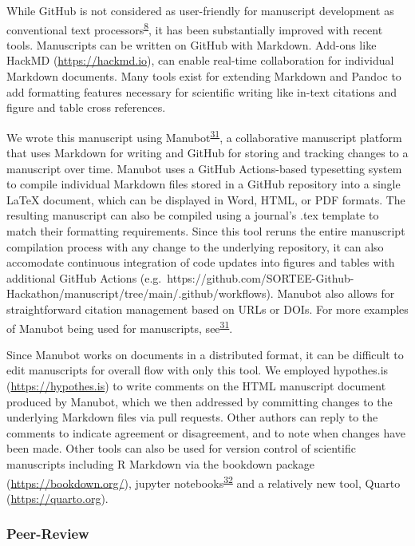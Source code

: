 While GitHub is not considered as user-friendly for manuscript development as conventional text processors\textsuperscript{\protect\hyperlink{ref-4ny1onB0}{8}}, it has been substantially improved with recent tools.
Manuscripts can be written on GitHub with Markdown.
Add-ons like HackMD (\url{https://hackmd.io}), can enable real-time collaboration for individual Markdown documents.
Many tools exist for extending Markdown and Pandoc to add formatting features necessary for scientific writing like in-text citations and figure and table cross references.

We wrote this manuscript using Manubot\textsuperscript{\protect\hyperlink{ref-YuJbg3zO}{31}}, a collaborative manuscript platform that uses Markdown for writing and GitHub for storing and tracking changes to a manuscript over time.
Manubot uses a GitHub Actions-based typesetting system to compile individual Markdown files stored in a GitHub repository into a single LaTeX document, which can be displayed in Word, HTML, or PDF formats.
The resulting manuscript can also be compiled using a journal's .tex template to match their formatting requirements.
Since this tool reruns the entire manuscript compilation process with any change to the underlying repository, it can also accomodate continuous integration of code updates into figures and tables with additional GitHub Actions (e.g.~https://github.com/SORTEE-Github-Hackathon/manuscript/tree/main/.github/workflows).
Manubot also allows for straightforward citation management based on URLs or DOIs.
For more examples of Manubot being used for manuscripts, see\textsuperscript{\protect\hyperlink{ref-YuJbg3zO}{31}}.

Since Manubot works on documents in a distributed format, it can be difficult to edit manuscripts for overall flow with only this tool.
We employed hypothes.is (\url{https://hypothes.is}) to write comments on the HTML manuscript document produced by Manubot, which we then addressed by committing changes to the underlying Markdown files via pull requests.
Other authors can reply to the comments to indicate agreement or disagreement, and to note when changes have been made.
Other tools can also be used for version control of scientific manuscripts including R Markdown via the bookdown package (\url{https://bookdown.org/}), jupyter notebooks\textsuperscript{\protect\hyperlink{ref-i4FOZpjN}{32}} and a relatively new tool, Quarto (\url{https://quarto.org}).

\hypertarget{peer-review}{%
\subsubsection{Peer-Review}\label{peer-review}}


